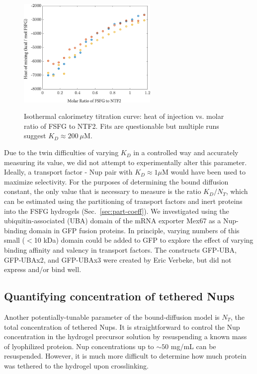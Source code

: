 \begin{figure}
\caption{Isothermal calorimetry titration curve: heat of injection vs. molar ratio of FSFG to NTF2. Fits are questionable but multiple runs suggest $K_D \approx 200\ \mu$M.\\}
\centering
\includegraphics[width=0.6\textwidth]{figs/ch04/ITC_runs}
\label{fig:ITC-runs}
\end{figure} 

Due to the twin difficulties of varying $K_D$ in a controlled way and accurately measuring its value, we did not attempt to experimentally alter this parameter.  Ideally, a transport factor - Nup pair with $K_D \approx 1 \mu$M would have been used to maximize selectivity.  For the purposes of determining the bound diffusion constant, the only value that is necessary to measure is the ratio $K_D/N_T$, which can be estimated using the partitioning of transport factors and inert proteins into the FSFG hydrogels (Sec.~\ref{sec:part-coeff}).  We investigated using the ubiquitin-associated (UBA) domain of the mRNA exporter Mex67 as a Nup-binding domain in GFP fusion proteins.  In principle, varying numbers of this small ($<$10 kDa) domain could be added to GFP to explore the effect of varying binding affinity and valency in transport factors.  The constructs GFP-UBA, GFP-UBAx2, and GFP-UBAx3 were created by Eric Verbeke, but did not express and/or bind well.


\subsection{Quantifying concentration of tethered Nups}

Another potentially-tunable parameter of the bound-diffusion model is $N_T$, the total concentration of tethered Nups.  It is straightforward to control the Nup concentration in the hydrogel precursor solution by resuspending a known mass of lyophilized proteion.  Nup concentrations up to $\sim 50$ mg/mL can be resuspended.  However, it is much more difficult to determine how much protein was tethered to the hydrogel upon crosslinking. 

